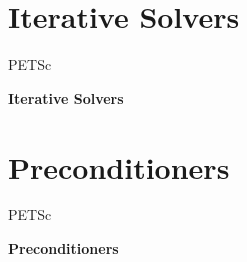 %
%

\section{Iterative Solvers}
\begin{frame}{PETSc}
   \begin{center} \Large \textbf{Iterative Solvers} \end{center}
\end{frame}










%
% 

\section{Preconditioners}
\begin{frame}{PETSc}
   \begin{center} \Large \textbf{Preconditioners} \end{center}
\end{frame}



%










